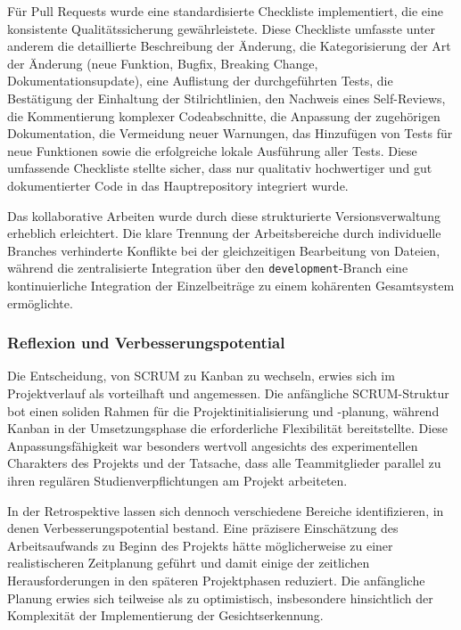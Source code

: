 Für Pull Requests wurde eine standardisierte Checkliste implementiert, die eine konsistente Qualitätssicherung gewährleistete. Diese Checkliste umfasste unter anderem die detaillierte Beschreibung der Änderung, die Kategorisierung der Art der Änderung (neue Funktion, Bugfix, Breaking Change, Dokumentationsupdate), eine Auflistung der durchgeführten Tests, die Bestätigung der Einhaltung der Stilrichtlinien, den Nachweis eines Self-Reviews, die Kommentierung komplexer Codeabschnitte, die Anpassung der zugehörigen Dokumentation, die Vermeidung neuer Warnungen, das Hinzufügen von Tests für neue Funktionen sowie die erfolgreiche lokale Ausführung aller Tests. Diese umfassende Checkliste stellte sicher, dass nur qualitativ hochwertiger und gut dokumentierter Code in das Hauptrepository integriert wurde.

Das kollaborative Arbeiten wurde durch diese strukturierte Versionsverwaltung erheblich erleichtert. Die klare Trennung der Arbeitsbereiche durch individuelle Branches verhinderte Konflikte bei der gleichzeitigen Bearbeitung von Dateien, während die zentralisierte Integration über den \texttt{development}-Branch eine kontinuierliche Integration der Einzelbeiträge zu einem kohärenten Gesamtsystem ermöglichte.

\subsubsection{Reflexion und Verbesserungspotential}

Die Entscheidung, von SCRUM zu Kanban zu wechseln, erwies sich im Projektverlauf als vorteilhaft und angemessen. Die anfängliche SCRUM-Struktur bot einen soliden Rahmen für die Projektinitialisierung und -planung, während Kanban in der Umsetzungsphase die erforderliche Flexibilität bereitstellte. Diese Anpassungsfähigkeit war besonders wertvoll angesichts des experimentellen Charakters des Projekts und der Tatsache, dass alle Teammitglieder parallel zu ihren regulären Studienverpflichtungen am Projekt arbeiteten.

In der Retrospektive lassen sich dennoch verschiedene Bereiche identifizieren, in denen Verbesserungspotential bestand. Eine präzisere Einschätzung des Arbeitsaufwands zu Beginn des Projekts hätte möglicherweise zu einer realistischeren Zeitplanung geführt und damit einige der zeitlichen Herausforderungen in den späteren Projektphasen reduziert. Die anfängliche Planung erwies sich teilweise als zu optimistisch, insbesondere hinsichtlich der Komplexität der Implementierung der Gesichtserkennung.

